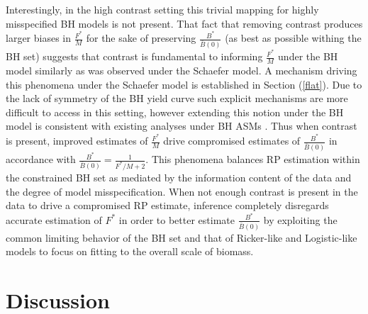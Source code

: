 %
Interestingly, in the high contrast setting this trivial mapping for 
highly misspecified BH models is not present. That fact that removing contrast 
produces larger biases in $\frac{F^*}{M}$ for the sake of 
preserving $\frac{B^*}{\bar B(0)}$ (as best as possible withing the BH set) suggests that 
contrast is fundamental to informing $\frac{F^*}{M}$ under the BH model similarly as was 
observed under the Schaefer model. A mechanism driving this phenomena under the Schaefer 
model is established in Section (\ref{flat}). Due to the lack of symmetry of the BH yield 
curve such explicit mechanisms are more difficult to access in this setting, however extending this 
notion under the BH model is consistent with existing analyses under BH ASMs \cite{conn_when_2010, lee_can_2012}.    
Thus when contrast is present, improved estimates of $\frac{F^*}{M}$ drive 
compromised estimates of $\frac{B^*}{\bar B(0)}$
in accordance with $\frac{B^*}{\bar B(0)}=\frac{1}{F^*/M+2}$.
This phenomena balances RP estimation within the constrained BH set as
mediated by the information content of the data and the degree of model
misspecification. When not enough contrast is present in the data to %
drive a compromised RP estimate, inference completely disregards accurate
estimation of $F^*$ in order to better estimate $\frac{B^*}{\bar B(0)}$
by exploiting the common limiting behavior of the BH set and that of
Ricker-like and Logistic-like models to focus on fitting to the overall 
scale of biomass.



\section{Discussion}


